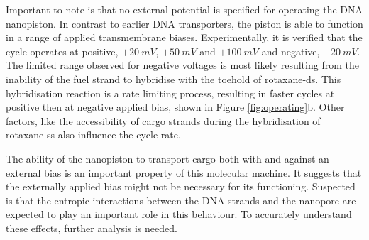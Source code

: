 Important to note is that no external potential is specified for operating the DNA
nanopiston. In contrast to earlier DNA transporters, the piston is able to function in a
range of applied transmembrane biases. Experimentally, it is verified that the
cycle operates at positive, $+20\ mV$, $+50\ mV$ and $+100\ mV$ and negative, $ - 20\
mV$. The limited range observed for negative voltages is most likely resulting from the
inability of the fuel strand to hybridise with the toehold of rotaxane-ds. This
hybridisation reaction is a rate limiting process, resulting in faster cycles at positive
then at negative applied bias, shown in Figure \ref{fig:operating}b. Other factors, like
the accessibility of cargo strands during the hybridisation of rotaxane-ss also influence
the cycle rate.

The ability of the nanopiston to transport cargo both with and against an external bias
is an important property of this molecular machine. It suggests that the externally
applied bias might not be necessary for its functioning. Suspected is that the entropic
interactions between the DNA strands and the nanopore are expected to play an important
role in this behaviour. To accurately understand these effects, further analysis is
needed.

